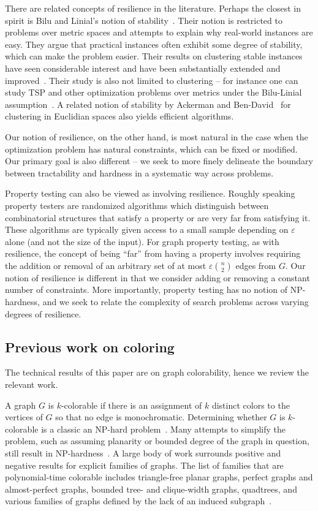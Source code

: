 \documentclass{article}[11pt]  %
\begin{document}
There are related concepts of resilience in the literature. Perhaps the closest
in spirit is Bilu and Linial's notion of stability~\cite{BL12}.  Their notion
is restricted to problems over metric spaces and attempts to explain why
real-world instances are easy.  They argue that practical instances often
exhibit some degree of stability, which can make the problem easier.  Their
results on clustering stable instances have seen considerable interest and have
been substantially extended and improved~\cite{ABS10,BL12,Rey11}.  Their study
is also not limited to clustering -- for instance one can study TSP and other
optimization problems over metrics under the Bilu-Linial
assumption~\cite{MSSW11}.  A related notion of stability by 
Ackerman and Ben-David~\cite{AckermanB09} for clustering 
in Euclidian spaces also yields efficient algorithms.


Our notion of resilience, on the other hand, is most natural in the case when
the optimization problem has natural constraints, which can be fixed or
modified.  Our primary goal is also different -- we seek to more finely
delineate the boundary between tractability and hardness in a systematic way
across problems.

Property testing can also be viewed as involving resilience. Roughly speaking
property testers are randomized algorithms which distinguish between
combinatorial structures that satisfy a property or are very far from satisfying
it. These algorithms are typically given access to a small sample depending on
$\varepsilon$ alone (and not the size of the input). For graph property testing,
as with resilience, the concept of being ``far'' from having a property involves
requiring the addition or removal of an arbitrary set of at most $\varepsilon
\binom{n}{2}$ edges from $G$. Our notion of resilience is different in that we
consider adding or removing a constant number of constraints. More importantly,
property testing has no notion of NP-hardness, and we seek to relate the
complexity of search problems across varying degrees of resilience. 

\subsection{Previous work on coloring}

The technical results of this paper are on graph colorability, hence we review
the relevant work.

A graph $G$ is $k$-colorable if there is an assignment of $k$ distinct colors
to the vertices of $G$ so that no edge is monochromatic. Determining whether
$G$ is $k$-colorable is a classic an NP-hard problem~\cite{Karp72}. Many 
attempts to simplify the problem, such as assuming planarity or bounded degree
of the graph in question, still result in NP-hardness~\cite{Dailey80}. A large
body of work surrounds positive and negative results for explicit families of
graphs. The list of families that are polynomial-time colorable includes
triangle-free planar graphs, perfect graphs and almost-perfect graphs, bounded
tree- and clique-width graphs, quadtrees, and various families of graphs
defined by the lack of an induced
subgraph~\cite{HMM10,Ko03,EBH99,Cai03,KKTW01}.
\end{document}
